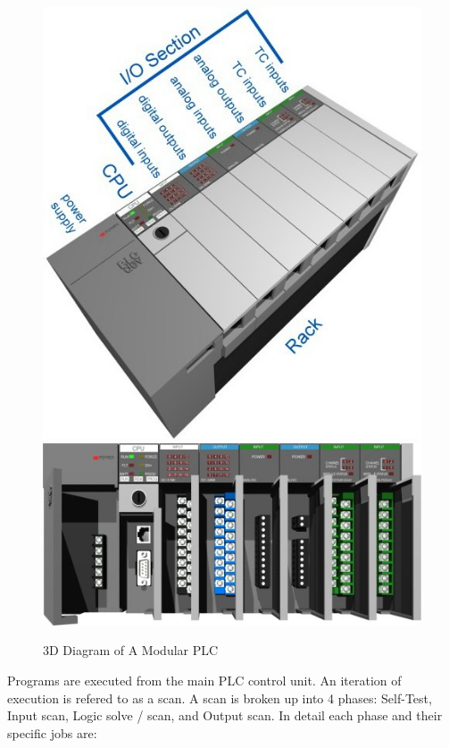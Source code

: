 \begin{figure}[htp]
    \centering
    \includegraphics[width=\imgmedphoto]{./images/c02_plcdev.jpg}
    \includegraphics[width=\imgmedphoto]{./images/c04_plcdev.jpg}
    \caption{3D Diagram of A Modular PLC \cite{img_c02_PlcDev,img_c04_PlcDev}}
    \label{img:plcrender_1}
\end{figure}

Programs are executed from the main PLC control unit. An iteration of execution is refered to as a scan. A scan is broken up into 4 phases: Self-Test, Input scan, Logic solve / scan, and Output scan. In detail each phase and their specific jobs are:


